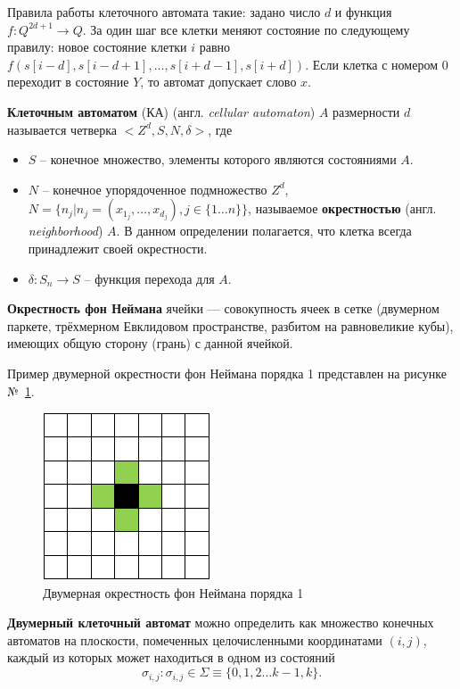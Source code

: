 \documentclass[a4paper, final]{article}
\begin{document}
Правила работы клеточного автомата такие: задано число $d$ и функция $f: Q^{2d+1} \rightarrow Q$. 
За один шаг все клетки меняют состояние по следующему правилу: новое состояние клетки $i$ равно 
$f(s[i-d],s[i-d+1],\dots,s[i+d-1],s[i+d])$. Если клетка с номером 0 переходит в состояние $Y$, 
то автомат допускает слово $x$.

\textbf{Клеточным автоматом} (КА) (англ. \textit{cellular automaton}) $A$ размерности $d$ 
называется четверка $<Z^d,S,N,\delta>$, где
\begin{itemize}
\item $S$ -- конечное множество, элементы которого являются состояниями $A$.
\item $N$ -- конечное упорядоченное подмножество $Z^d$, $N=\{n_j | n_j = (x_{1_j},\dots,x_{d_j}),
j \in \{1 \dots n\}\}$, называемое \textbf{окрестностью} (англ. \textit{neighborhood}) $A$.
В данном определении полагается, что клетка всегда принадлежит своей окрестности.
\item $\delta : S_n \rightarrow S$ -- функция перехода для $A$. \cite{bib:linearcellularautomaton}
\end{itemize}

\textbf{Окрестность фон Неймана} ячейки --- совокупность ячеек в сетке 
(двумерном паркете, трёхмерном Евклидовом пространстве, разбитом на равновеликие кубы), 
имеющих общую сторону (грань) с данной ячейкой. \cite{bib:cellularautomaton}

Пример двумерной окрестности фон Неймана порядка 1 представлен на рисунке №~\ref{img:neyman}.
\begin{figure}[H]
   \centering
   \includegraphics[scale=1]{neyman.png}
   \caption{Двумерная окрестность фон Неймана порядка 1}
   \label{img:neyman}
\end{figure}

\textbf{Двумерный клеточный автомат} можно определить как множество конечных автоматов на плоскости, 
помеченных целочисленными координатами $(i, j)$, каждый из которых может находиться в одном из состояний
$$\sigma _{i,j}: \sigma _{i,j}\in \Sigma \equiv \{0,1,2...k-1,k\}.$$
\end{document}
